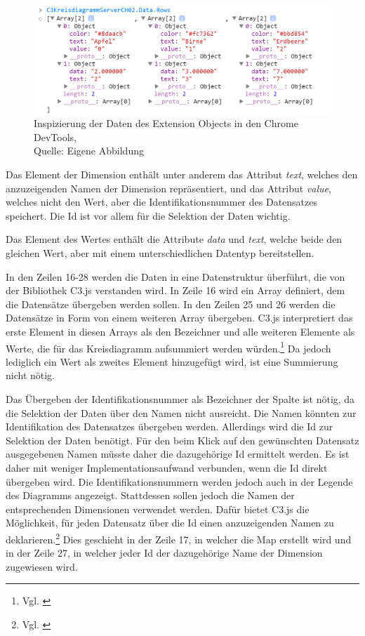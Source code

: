 \begin{figure}[htbp]
	\centering
		\includegraphics[width=1.00\textwidth]{./img/DevTools/DataRowsAll.png}
	\caption[Inspizierung der Daten des Extension Objects in den Chrome DevTools]{Inspizierung der Daten des Extension Objects in den Chrome DevTools,\\Quelle: Eigene Abbildung}
	\label{fig:InspectDataRowsAll}
\end{figure}

Das Element der Dimension enthält unter anderem das Attribut \textit{text}, welches den anzu\-zeigenden Namen der Dimension repräsentiert, und das Attribut \textit{value}, welches nicht den Wert, aber die Identifikationsnummer des Daten\-satzes speichert. Die Id ist vor allem für die Selektion der Daten wichtig.

Das Element des Wertes enthält die Attribute \textit{data} und \textit{text}, welche beide den gleichen Wert, aber mit einem unterschiedlichen Daten\-typ bereitstellen.


In den Zeilen 16-28 werden die Daten in eine Daten\-struktur überführt, die von der Bibliothek C3.js verstanden wird. In Zeile 16 wird ein Array definiert, dem die Daten\-sätze übergeben werden sollen. In den Zeilen 25 und 26 werden die Daten\-sätze in Form von einem weiteren Array übergeben. C3.js interpretiert das erste Element in diesen Arrays als den Bezeichner und alle weiteren Elemente als Werte, die für das Kreisdiagramm aufsummiert werden würden.\footnote{Vgl. \cite{C3ColumnOrientedData}} Da jedoch lediglich ein Wert als zweites Element hinzugefügt wird, ist eine Summierung nicht nötig.



Das Übergeben der Identifikationsnummer als Bezeichner der Spalte ist nötig, da die Selektion der Daten über den Namen nicht ausreicht. Die Namen könnten zur Identifikation des Daten\-satzes übergeben werden. Allerdings wird die Id zur Selektion der Daten benötigt. Für den beim Klick auf den gewünschten Daten\-satz ausgegebenen Namen müsste daher die dazugehörige Id ermittelt werden. Es ist daher mit weniger Implementationsaufwand verbunden, wenn die Id direkt übergeben wird. Die Identifikationsnummern werden jedoch auch in der Legende des Diagramms angezeigt. Stattdessen sollen jedoch die Namen der entsprechenden Dimensionen verwendet werden. Dafür bietet C3.js die Möglich\-keit, für jeden Daten\-satz über die Id einen anzuzeigenden Namen zu deklarieren.\footnote{Vgl. \cite{C3DataName}} Dies geschieht in der Zeile 17, in welcher die Map erstellt wird und in der Zeile 27, in welcher jeder Id der dazugehörige Name der Dimension zugewiesen wird.

